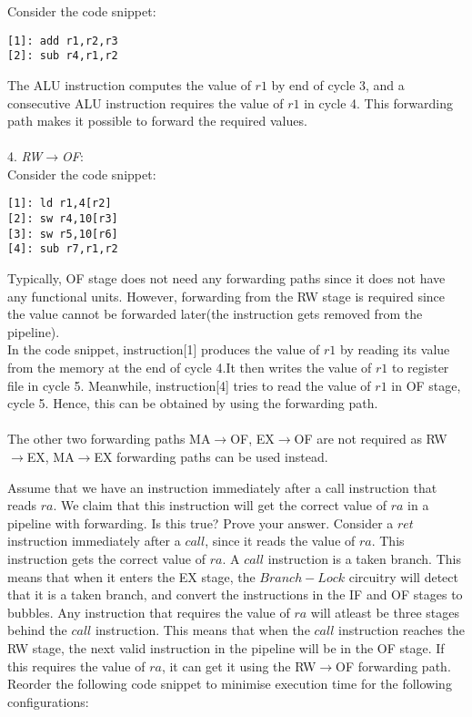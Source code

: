 \begin{ExerciseList}
\begin{enumerate}[i) ]
  Consider the code snippet: \\
\begin{Verbatim}
[1]: add r1,r2,r3
[2]: sub r4,r1,r2
\end{Verbatim}
The ALU instruction computes the value of $r1$ by end of cycle 3, and a consecutive ALU instruction requires the value of $r1$ in cycle 4. This forwarding path makes it possible to forward the required values. \\ \\
4. \textit{RW$\rightarrow$OF}: \\
  Consider the code snippet: \\
\begin{Verbatim}
[1]: ld r1,4[r2]
[2]: sw r4,10[r3]
[3]: sw r5,10[r6]
[4]: sub r7,r1,r2
\end{Verbatim}
Typically, OF stage does not need any forwarding paths since it does not have any functional units. However, forwarding from the RW stage is required since the value cannot be forwarded later(the instruction gets removed from the pipeline).\\ 
In the code snippet, instruction[1] produces the value of $r1$ by reading its value from the memory at the end of cycle 4.It then writes the value of $r1$ to register file in cycle 5. Meanwhile, instruction[4] tries to read the value of $r1$ in OF stage, cycle 5. Hence, this can be obtained by using the forwarding path. \\ \\
The other two forwarding paths MA$\rightarrow$OF, EX$\rightarrow$OF are not required as RW$\rightarrow$EX, MA$\rightarrow$EX forwarding paths can be used instead. \\
\end{enumerate}

\Exercise Assume that we have an instruction immediately after a call instruction that reads $ra$. We claim 
that this instruction will get the correct value of $ra$ in a pipeline with forwarding. Is this true? Prove your answer.
\Answer
Consider a $ret$ instruction immediately after a $call$, since it reads the value of $ra$. This instruction gets the correct value of $ra$.
A $call$ instruction is a taken branch. This means that when it enters the EX stage, the $Branch-Lock$ circuitry will detect that it is a taken branch, and convert the instructions in the IF and OF stages to bubbles. Any instruction that requires the value of $ra$ will atleast be three stages behind the $call$ instruction. This means that when the $call$ instruction reaches the RW stage, the next valid instruction in the pipeline will be in the OF stage. If this requires the value of $ra$, it can get it using the RW$\rightarrow$OF forwarding path. \\
\Exercise 
Reorder the following code snippet to minimise execution time for the following 
configurations: 


\end{ExerciseList}
